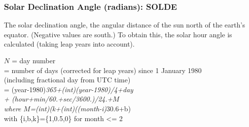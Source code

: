 \documentclass[
  english,
]{book}
\begin{document}
\hypertarget{solde}{%
\subsubsection*{Solar Declination Angle (radians): SOLDE}\label{solde}}

The solar declination angle, the angular distance of the sun north of the earth's equator. (Negative values are south.) To obtain this, the solar hour angle is calculated (taking leap years into account).

\(N\) = day number\\
\hspace*{0.333em}\hspace*{0.333em}\hspace*{0.333em}\hspace*{0.333em}= number of days (corrected for leap years) since 1 January 1980\\
\hspace*{0.333em}\hspace*{0.333em}\hspace*{0.333em}\hspace*{0.333em}\hspace*{0.333em}\hspace*{0.333em}\hspace*{0.333em}(including fractional day from UTC time)\\
\hspace*{0.333em}\hspace*{0.333em}\hspace*{0.333em}= (year-1980)\emph{365+(int)(year-1980)/4+day\\
\hspace*{0.333em}\hspace*{0.333em}\hspace*{0.333em}\hspace*{0.333em}\hspace*{0.333em}\hspace*{0.333em}+ (hour+min/60.+sec/3600.)/24.+\(M\)\\
\hspace*{0.333em}\hspace*{0.333em}\hspace*{0.333em}where \(M\)=(int)(k+(int)((month-i)}30.6+b)\\
\hspace*{0.333em}\hspace*{0.333em}\hspace*{0.333em}\hspace*{0.333em}\hspace*{0.333em}\hspace*{0.333em}with \{i,b,k\}=\{1,0.5,0\} for month \textless= 2\\
\end{document}
